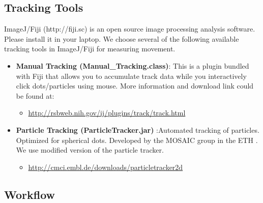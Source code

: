 \documentclass[11pnt]{article}
\begin{document}
\subsection{Tracking Tools}

ImageJ/Fiji (http://fiji.sc) is an open source image processing analysis software. Please install it in your laptop. We choose several of the following available tracking tools in ImageJ/Fiji for measuring movement. 

\begin{itemize}
\item \textbf{Manual Tracking (Manual\_Tracking.class)}: 
This is a plugin bundled with Fiji that allows you to accumulate track data while you interactively click dots/particles using mouse. More information and download link could be found at:
\begin{itemize}
\item \url{http://rsbweb.nih.gov/ij/plugins/track/track.html}
\end{itemize}
\end{itemize}


\begin{itemize}
\item \textbf{Particle Tracking (ParticleTracker.jar)} :Automated tracking of particles. Optimized for spherical dots. Developed by the MOSAIC group in the ETH \citep{Sbalzarini2005a, Sbalzarini2006a}.  We use modified version of the particle tracker. 
\begin{itemize}
\item \url{http://cmci.embl.de/downloads/particletracker2d}
\end{itemize}
\end{itemize}

\subsection{Workflow}
\end{document}
